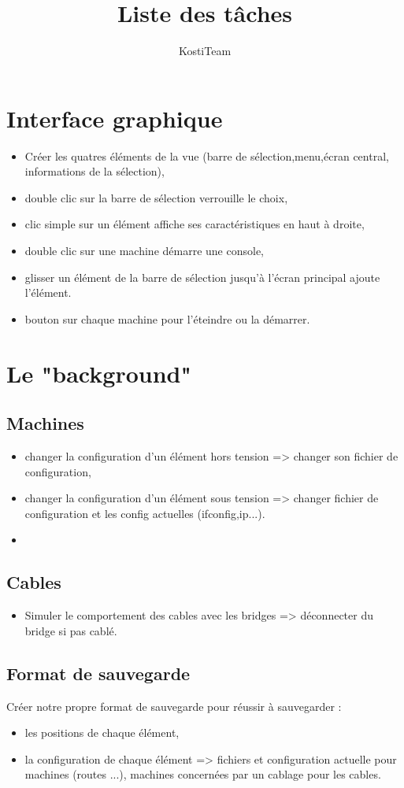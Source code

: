 \documentclass[a4paper]{article}
\author{KostiTeam}
\title{Liste des tâches}
\begin{document}
\maketitle
\tableofcontents
\newpage

\section{Interface graphique}

\begin{itemize}
\item Créer les quatres éléments de la vue (barre de sélection,menu,écran central, informations de la sélection),
\item double clic sur la barre de sélection verrouille le choix,
\item clic simple sur un élément affiche ses caractéristiques en haut à droite,
\item double clic sur une machine démarre une console,
\item glisser un élément de la barre de sélection jusqu'à l'écran principal ajoute l'élément.
\item bouton sur chaque machine pour l'éteindre ou la démarrer.
\end{itemize}

\section{Le "background"}
\subsection{Machines}
\begin{itemize}
\item changer la configuration d'un élément hors tension => changer son fichier de configuration,
\item changer la configuration d'un élément sous tension => changer fichier de configuration et les config actuelles (ifconfig,ip...). 
\item 
\end{itemize}

\subsection{Cables}
\begin{itemize}
\item Simuler le comportement des cables avec les bridges => déconnecter du bridge si pas cablé.
\end{itemize}

\subsection{Format de sauvegarde}
Créer notre propre format de sauvegarde pour réussir à sauvegarder : 
\begin{itemize}
\item les positions de chaque élément,
\item la configuration de chaque élément => fichiers et configuration actuelle pour machines (routes ...),
machines concernées par un cablage pour les cables.
\end{itemize}
\end{document}
